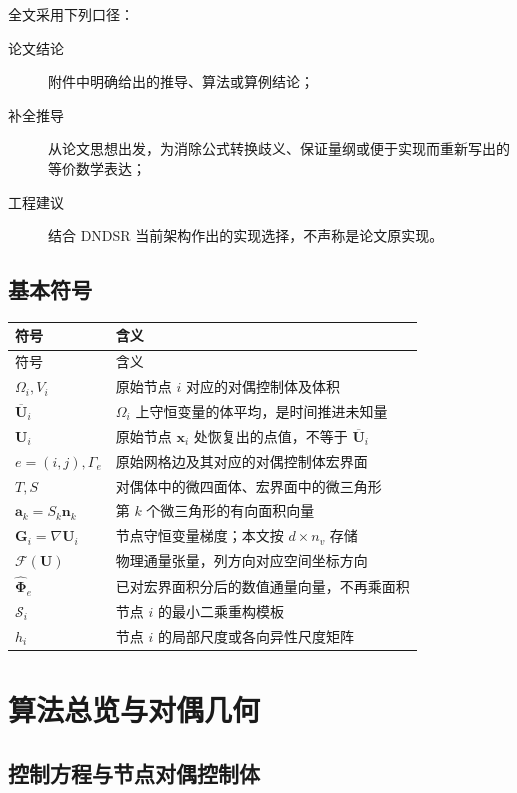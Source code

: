 \documentclass[UTF8,a4paper,11pt,openany]{ctexrep}
\numberwithin{equation}{chapter}
\newcommand{\Ubar}{\overline{\bm U}}
\newcommand{\Flux}{\bm{\mathcal F}}
\newcommand{\grad}{\nabla}
\begin{document}
全文采用下列口径：

\begin{description}
  \item[论文结论] 附件中明确给出的推导、算法或算例结论；
  \item[补全推导] 从论文思想出发，为消除公式转换歧义、保证量纲或便于实现而重新写出的等价数学表达；
  \item[工程建议] 结合 DNDSR 当前架构作出的实现选择，不声称是论文原实现。
\end{description}

\section{基本符号}

\begin{longtable}{>{\raggedright\arraybackslash}p{}p{}}
\toprule
符号 & 含义\\
\midrule
\endfirsthead
\toprule
符号 & 含义\\
\midrule
\endhead
$\Omega_i,V_i$ & 原始节点 $i$ 对应的对偶控制体及体积\\
$\Ubar_i$ & $\Omega_i$ 上守恒变量的体平均，是时间推进未知量\\
$\bm U_i$ & 原始节点 $\bm x_i$ 处恢复出的点值，不等于 $\Ubar_i$\\
$e=(i,j),\Gamma_e$ & 原始网格边及其对应的对偶控制体宏界面\\
$T,S$ & 对偶体中的微四面体、宏界面中的微三角形\\
$\bm a_k=S_k\bm n_k$ & 第 $k$ 个微三角形的有向面积向量\\
$\bm G_i=\grad\bm U_i$ & 节点守恒变量梯度；本文按 $d\times n_v$ 存储\\
$\Flux(\bm U)$ & 物理通量张量，列方向对应空间坐标方向\\
$\widehat{\bm\Phi}_e$ & 已对宏界面积分后的数值通量向量，不再乘面积\\
$\mathcal S_i$ & 节点 $i$ 的最小二乘重构模板\\
$h_i$ & 节点 $i$ 的局部尺度或各向异性尺度矩阵\\
\bottomrule
\end{longtable}

\chapter{算法总览与对偶几何}

\section{控制方程与节点对偶控制体}
\end{document}

